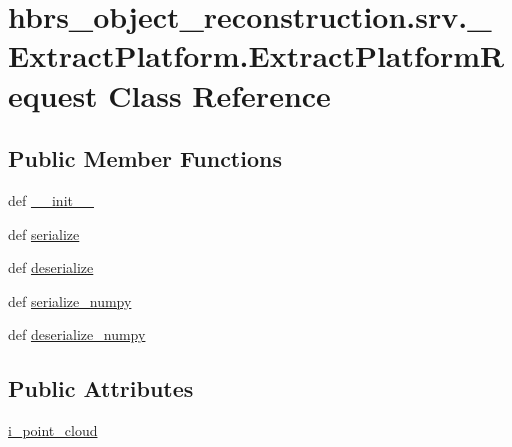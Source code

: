 \hypertarget{classhbrs__object__reconstruction_1_1srv_1_1___extract_platform_1_1_extract_platform_request}{\section{hbrs\-\_\-object\-\_\-reconstruction.\-srv.\-\_\-\-Extract\-Platform.\-Extract\-Platform\-Request \-Class \-Reference}
\label{classhbrs__object__reconstruction_1_1srv_1_1___extract_platform_1_1_extract_platform_request}
}
\subsection*{\-Public \-Member \-Functions}
\begin{DoxyCompactItemize}
\item 
def \hyperlink{classhbrs__object__reconstruction_1_1srv_1_1___extract_platform_1_1_extract_platform_request_aca8dd1f116b3016df251d08aa5c62ff9}{\-\_\-\-\_\-init\-\_\-\-\_\-}
\item 
def \hyperlink{classhbrs__object__reconstruction_1_1srv_1_1___extract_platform_1_1_extract_platform_request_af15f40208832c593d95b3e64369ced6d}{serialize}
\item 
def \hyperlink{classhbrs__object__reconstruction_1_1srv_1_1___extract_platform_1_1_extract_platform_request_ae4366cc755c65b3f64efa109cc52361a}{deserialize}
\item 
def \hyperlink{classhbrs__object__reconstruction_1_1srv_1_1___extract_platform_1_1_extract_platform_request_ab94fc56ee08d5c0ee8b147a71648125a}{serialize\-\_\-numpy}
\item 
def \hyperlink{classhbrs__object__reconstruction_1_1srv_1_1___extract_platform_1_1_extract_platform_request_a04e812a0a8ebf3d8f83f75344f2087ed}{deserialize\-\_\-numpy}
\end{DoxyCompactItemize}
\subsection*{\-Public \-Attributes}
\begin{DoxyCompactItemize}
\item 
\hyperlink{classhbrs__object__reconstruction_1_1srv_1_1___extract_platform_1_1_extract_platform_request_ac465a0550257d3068eb4c26887648ea2}{i\-\_\-point\-\_\-cloud}
\end{DoxyCompactItemize}
